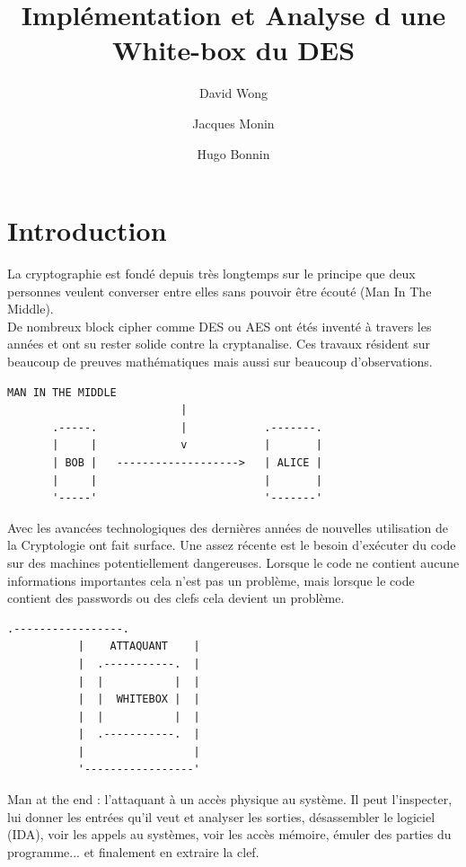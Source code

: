 \documentclass[a4paper,12pt]{article}
\author{David Wong
  \and Jacques Monin
  \and Hugo Bonnin}
\title{Implémentation et Analyse d une White-box du DES}
\begin{document}
\maketitle

\newpage

\tableofcontents

\newpage

\section{Introduction}

La cryptographie est fondé depuis très longtemps sur le principe que deux personnes veulent converser entre elles sans pouvoir être écouté (Man In The Middle).\\
De nombreux block cipher comme DES ou AES ont étés inventé à travers les années et ont su rester solide contre la cryptanalise. Ces travaux résident sur beaucoup de preuves mathématiques mais aussi sur beaucoup d'observations.

\begin{Verbatim}[samepage=true]
                   MAN IN THE MIDDLE
                           |
       .-----.             |            .-------.
       |     |             v            |       |
       | BOB |   ------------------->   | ALICE |
       |     |                          |       |
       '-----'                          '-------'
\end{Verbatim}

Avec les avancées technologiques des dernières années de nouvelles utilisation de la Cryptologie ont fait surface. Une assez récente est le besoin d'exécuter du code sur des machines potentiellement dangereuses. Lorsque le code ne contient aucune informations importantes cela n'est pas un problème, mais lorsque le code contient des passwords ou des clefs cela devient un problème.\\

\begin{Verbatim}[samepage=true]
           .-----------------. 
           |    ATTAQUANT    |
           |  .-----------.  |  
           |  |           |  |  
           |  |  WHITEBOX |  | 
           |  |           |  | 
           |  .-----------.  |
           |                 |
           '-----------------'
\end{Verbatim}

Man at the end : l'attaquant à un accès physique au système. Il peut l'inspecter, lui donner les entrées qu'il veut et analyser les sorties, désassembler le logiciel (IDA), voir les appels au systèmes, voir les accès mémoire, émuler des parties du programme... et finalement en extraire la clef.\\
\end{document}
